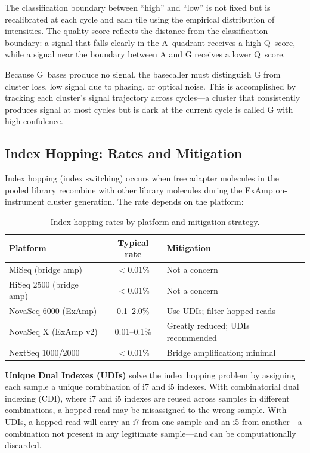 The classification boundary between ``high'' and ``low'' is not fixed but is recalibrated at each cycle and each tile using the empirical distribution of intensities. The quality score reflects the distance from the classification boundary: a signal that falls clearly in the A~quadrant receives a high Q~score, while a signal near the boundary between A and G receives a lower Q~score.

Because G~bases produce no signal, the basecaller must distinguish G from cluster loss, low signal due to phasing, or optical noise. This is accomplished by tracking each cluster's signal trajectory across cycles---a cluster that consistently produces signal at most cycles but is dark at the current cycle is called G with high confidence.


\subsection{Index Hopping: Rates and Mitigation}
\label{subsec:shortread:index-hopping}

Index hopping (index switching) occurs when free adapter molecules in the pooled library recombine with other library molecules during the ExAmp on-instrument cluster generation. The rate depends on the platform:

\begin{table}[htbp]
\centering
\caption{Index hopping rates by platform and mitigation strategy.}
\label{tab:shortread:index-hopping}
\small
\begin{tabularx}{\textwidth}{l c X}
\toprule
\textbf{Platform} & \textbf{Typical rate} & \textbf{Mitigation} \\
\midrule
MiSeq (bridge amp) & $<$0.01\% & Not a concern \\
HiSeq 2500 (bridge amp) & $<$0.01\% & Not a concern \\
NovaSeq 6000 (ExAmp) & 0.1--2.0\% & Use UDIs; filter hopped reads \\
NovaSeq X (ExAmp v2) & 0.01--0.1\% & Greatly reduced; UDIs recommended \\
NextSeq 1000/2000 & $<$0.01\% & Bridge amplification; minimal \\
\bottomrule
\end{tabularx}
\end{table}

\textbf{Unique Dual Indexes (UDIs)} solve the index hopping problem by assigning each sample a unique combination of i7 and i5 indexes. With combinatorial dual indexing (CDI), where i7 and i5 indexes are reused across samples in different combinations, a hopped read may be misassigned to the wrong sample. With UDIs, a hopped read will carry an i7 from one sample and an i5 from another---a combination not present in any legitimate sample---and can be computationally discarded.

